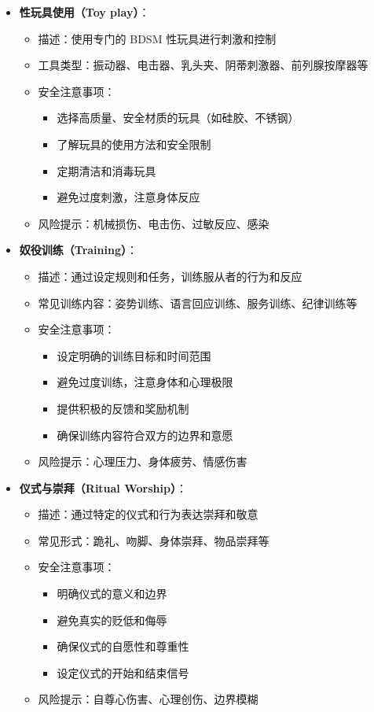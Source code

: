 \documentclass[12pt,UTF8]{ctexbook}
\begin{document}
\begin{itemize}
\begin{itemize}
    \end{itemize}
  \item \textbf{性玩具使用（Toy play）}：
    \begin{itemize}
    \item 描述：使用专门的 BDSM 性玩具进行刺激和控制
    \item 工具类型：振动器、电击器、乳头夹、阴蒂刺激器、前列腺按摩器等
    \item 安全注意事项：
      \begin{itemize}
      \item 选择高质量、安全材质的玩具（如硅胶、不锈钢）
      \item 了解玩具的使用方法和安全限制
      \item 定期清洁和消毒玩具
      \item 避免过度刺激，注意身体反应
      \end{itemize}
    \item 风险提示：机械损伤、电击伤、过敏反应、感染
    \end{itemize}
  \item \textbf{奴役训练（Training）}：
    \begin{itemize}
    \item 描述：通过设定规则和任务，训练服从者的行为和反应
    \item 常见训练内容：姿势训练、语言回应训练、服务训练、纪律训练等
    \item 安全注意事项：
      \begin{itemize}
      \item 设定明确的训练目标和时间范围
      \item 避免过度训练，注意身体和心理极限
      \item 提供积极的反馈和奖励机制
      \item 确保训练内容符合双方的边界和意愿
      \end{itemize}
    \item 风险提示：心理压力、身体疲劳、情感伤害
    \end{itemize}
  \item \textbf{仪式与崇拜（Ritual  Worship）}：
    \begin{itemize}
    \item 描述：通过特定的仪式和行为表达崇拜和敬意
    \item 常见形式：跪礼、吻脚、身体崇拜、物品崇拜等
    \item 安全注意事项：
      \begin{itemize}
      \item 明确仪式的意义和边界
      \item 避免真实的贬低和侮辱
      \item 确保仪式的自愿性和尊重性
      \item 设定仪式的开始和结束信号
      \end{itemize}
    \item 风险提示：自尊心伤害、心理创伤、边界模糊
    \end{itemize}
  \end{itemize}
\end{document}
